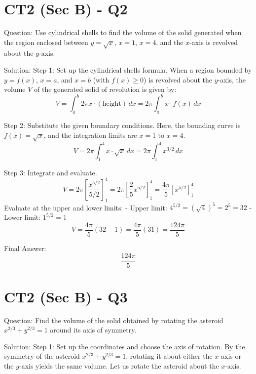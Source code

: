\documentclass{article}
\begin{document}
\section*{CT2 (Sec B) - Q2}
Question:
Use cylindrical shells to find the volume of the solid generated when the region enclosed between $y = \sqrt{x}$, $x = 1$, $x = 4$, and the $x$-axis is revolved about the $y$-axis.

Solution:
Step 1: Set up the cylindrical shells formula.
When a region bounded by $y = f(x)$, $x = a$, and $x = b$ (with $f(x) \ge 0$) is revolved about the $y$-axis, the volume $V$ of the generated solid of revolution is given by:
\[
V = \int_{a}^{b} 2\pi x \cdot (\text{height}) \, dx = 2\pi \int_{a}^{b} x \cdot f(x) \, dx
\]

Step 2: Substitute the given boundary conditions.
Here, the bounding curve is $f(x) = \sqrt{x}$, and the integration limits are $x = 1$ to $x = 4$.
\[
V = 2\pi \int_{1}^{4} x \cdot \sqrt{x} \, dx = 2\pi \int_{1}^{4} x^{3/2} \, dx
\]

Step 3: Integrate and evaluate.
\[
V = 2\pi \left[ \frac{x^{5/2}}{5/2} \right]_{1}^{4} = 2\pi \left[ \frac{2}{5} x^{5/2} \right]_{1}^{4} = \frac{4\pi}{5} \left[ x^{5/2} \right]_{1}^{4}
\]
Evaluate at the upper and lower limits:
- Upper limit: $4^{5/2} = (\sqrt{4})^5 = 2^5 = 32$
- Lower limit: $1^{5/2} = 1$
\[
V = \frac{4\pi}{5} (32 - 1) = \frac{4\pi}{5} (31) = \frac{124\pi}{5}
\]

Final Answer:
\[
\boxed{\frac{124\pi}{5}}
\]

\section*{CT2 (Sec B) - Q3}
Question:
Find the volume of the solid obtained by rotating the asteroid $x^{2/3} + y^{2/3} = 1$ around its axis of symmetry.

Solution:
Step 1: Set up the coordinates and choose the axis of rotation.
By the symmetry of the asteroid $x^{2/3} + y^{2/3} = 1$, rotating it about either the $x$-axis or the $y$-axis yields the same volume. Let us rotate the asteroid about the $x$-axis.
\end{document}
